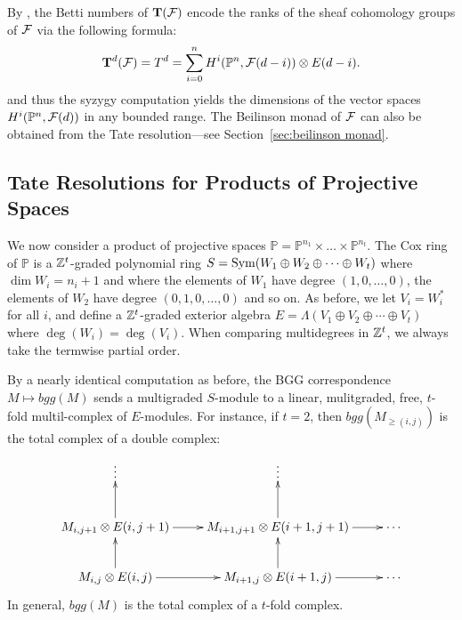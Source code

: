 \documentclass[twoside,12pt, leqno]{amsart}
\def\PP{{\mathbb P}}
\DeclareMathOperator{\rH}{{\rm H}}
\def\bT{{\bf T}}
\def\bU{{\bf U}}
\def\rH{{\rm H}}
\begin{document}
By \cite[Theorem 4.1] {EFS}, the Betti numbers of $\bT(\sF)$ encode the ranks of the sheaf cohomology groups of ${\mathcal F}$ via the following formula:
$$
\bT^d(\sF) =T^d= \sum_{i=0}^n H^i(\PP^n,\sF(d-i)) \otimes E(d-i).
$$
and thus the syzygy computation yields the dimensions of the vector spaces $H^i(\PP^n,\sF(d))$ in any bounded range. The Beilinson monad of ${\mathcal F}$ can also be obtained from the Tate resolution---see Section~\ref{sec:beilinson monad}.

% 
% 

\subsection{Tate Resolutions for Products of Projective Spaces}
We now consider a product of projective spaces $\PP = \PP^{n_1}\times \ldots \times \PP^{n_{t}}$.  The Cox ring of $\PP$ is a ${\mathbb Z}^{t}$-graded polynomial ring $S=\operatorname{Sym} (W_1\oplus W_2 \oplus \cdots \oplus W_t)$ where $\dim W_i=n_i+1$ and where the elements of $W_1$ have degree $(1,0,\dots,0)$, the elements of $W_2$ have degree $(0,1,0,\dots,0)$ and so on.  As before, we let $V_i=W_i^*$ for all $i$, and define a ${\mathbb Z}^{t}$-graded exterior algebra $E=\Lambda (V_1\oplus V_2\oplus \cdots \oplus V_t)$ where $\deg(W_i)=\deg(V_i)$.  When comparing multidegrees in ${\mathbb Z}^t$, we always take the termwise partial order.  

By a nearly identical computation as before, the BGG correspondence $M\mapsto bgg(M)$ sends a multigraded $S$-module to a linear, mulitgraded, free, $t$-fold multil-complex of $E$-modules.  For instance, if $t=2$, then $bgg(M_{\ge(i,j)})$ is the total complex of a double complex:
\begin{equation}\label{eqn:uppercorner}
\xymatrix{ \vdots & \vdots & \\
 M_{i,j+1}\otimes E(i,j+1) \ar[r]\ar[u]& M_{i+1,j+1}\otimes E(i+1,j+1)\ar[u] \ar[r] & \cdots \\
 M_{i,j}\otimes E(i,j) \ar[r]\ar[u]& M_{i+1,j}\otimes E(i+1,j) \ar[u]  \ar[r] & \cdots \\
}
\end{equation}
In general, $bgg(M)$ is the total complex of a $t$-fold complex.
\end{document}
